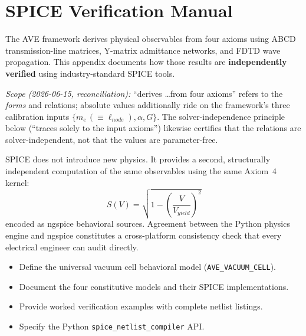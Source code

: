 %

\chapter{SPICE Verification Manual}
\label{app:spice_verification}

The AVE framework derives physical observables from four axioms using
ABCD transmission-line matrices, Y-matrix admittance networks, and FDTD
wave propagation.  This appendix documents how those results are
\textbf{independently verified} using industry-standard SPICE tools.

\emph{Scope (2026-06-15, reconciliation):} ``derives \ldots from four axioms''
refers to the \emph{forms} and relations; absolute values additionally ride on
the framework's three calibration inputs $\{m_e\,(\equiv \ell_{node}), \alpha, G\}$.
The solver-independence principle below (``traces solely to the input axioms'')
likewise certifies that the relations are solver-independent, not that the
values are parameter-free.

SPICE does not introduce new physics.  It provides a second,
structurally independent computation of the same observables using the
same Axiom~4 kernel:
\begin{equation}
    S(V) = \sqrt{1 - \left(\frac{V}{V_{yield}}\right)^{\!2}}
    \label{eq:spice_kernel}
\end{equation}
encoded as ngspice behavioral sources.  Agreement between the Python
physics engine and ngspice constitutes a cross-platform consistency
check that every electrical engineer can audit directly.

\begin{objectivebox}
\begin{itemize}
    \item Define the universal vacuum cell behavioral model (\texttt{AVE\_VACUUM\_CELL}).
    \item Document the four constitutive models and their SPICE implementations.
    \item Provide worked verification examples with complete netlist listings.
    \item Specify the Python \texttt{spice\_netlist\_compiler} API.
\end{itemize}
\end{objectivebox}


